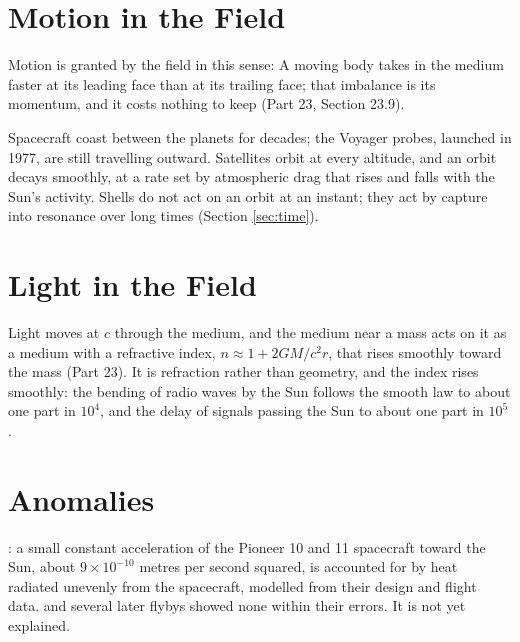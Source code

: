 \documentclass[11pt,a4paper]{article}
\begin{document}
\section{Motion in the Field}
\label{sec:motion}

Motion is granted by the field in this sense:  A moving body takes in the medium faster at its leading face than at its trailing face; that imbalance is its momentum, and it costs nothing to keep (Part 23, Section 23.9). 

 Spacecraft coast between the planets for decades; the Voyager probes, launched in 1977, are still travelling outward. Satellites orbit at every altitude, and an orbit decays smoothly, at a rate set by atmospheric drag that rises and falls with the Sun's activity. Shells do not act on an orbit at an instant; they act by capture into resonance over long times (Section \ref{sec:time}).

\section{Light in the Field}
\label{sec:light}

 Light moves at $c$ through the medium, and the medium near a mass acts on it as a medium with a refractive index, $n \approx 1 + 2GM/c^2 r$, that rises smoothly toward the mass (Part 23). It is refraction rather than geometry, and the index rises smoothly: the bending of radio waves by the Sun follows the smooth law to about one part in $10^4$, and the delay of signals passing the Sun to about one part in $10^5$.

\section{Anomalies}
\label{sec:anomalies}

: a small constant acceleration of the Pioneer 10 and 11 spacecraft toward the Sun, about $9\times10^{-10}$ metres per second squared, is accounted for by heat radiated unevenly from the spacecraft, modelled from their design and flight data.  and several later flybys showed none within their errors. It is not yet explained.
\end{document}
